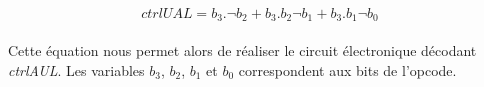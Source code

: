 	\begin{equation}
		\label{ual_eq}
		ctrlUAL = b_{3} . \neg b_{2} + b_{3} . b_{2} \neg b_{1}  + b_{3} . b_{1} \neg b_{0}
	\end{equation}

\paragraph{}{
	Cette équation nous permet alors de réaliser le circuit électronique 
	décodant \textit{ctrlAUL}. Les variables $b_{3}$, $b_{2}$, $b_{1}$ 
	et $b_{0}$ correspondent aux bits de l'opcode.
}